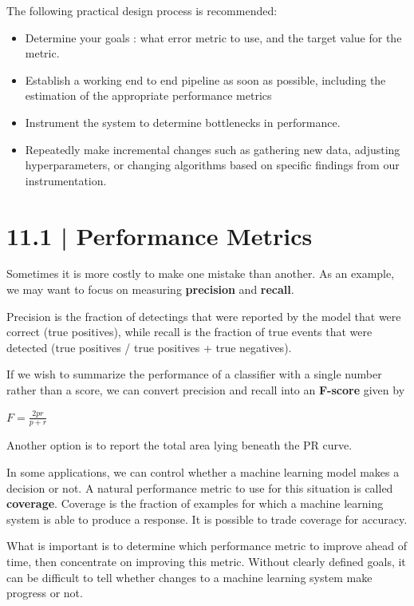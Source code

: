 \documentclass[letterpaper, 12pt]{report}
\begin{document}

The following practical design process is recommended: 

\begin{itemize}
\item Determine your goals : what error metric to use, and the target value for the metric.
\item Establish a working end to end pipeline as soon as possible, including the estimation of the appropriate performance metrics 
\item Instrument the system to determine bottlenecks in performance. 
\item Repeatedly make incremental changes such as gathering new data, adjusting hyperparameters, or changing algorithms based on specific findings from our instrumentation.
\end{itemize}
 
\section{11.1 | Performance Metrics}

Sometimes it is more costly to make one mistake than another. As an example, we may want to focus on measuring \textbf{precision} and \textbf{recall}. 

Precision is the fraction of detectings that were reported by the model that were correct (true positives), while recall is the fraction of true events that were detected (true positives / true positives + true negatives). 

If we wish to summarize the performance of a classifier with a single number rather than a score, we can convert precision and recall into an \textbf{F-score} given by 

\begin{center}
  $F = \frac{2pr}{p + r}$
\end{center}

Another option is to report the total area lying beneath the PR curve. 

In some applications, we can control whether a machine learning model makes a decision or not. A natural performance metric to use for this situation is called \textbf{coverage}. Coverage is the fraction of examples for which a machine learning system is able to produce a response. It is possible to trade coverage for accuracy. 

What is important is to determine which performance metric to improve ahead of time, then concentrate on improving this metric. Without clearly defined goals, it can be difficult to tell whether changes to a machine learning system make progress or not. 
\end{document}
